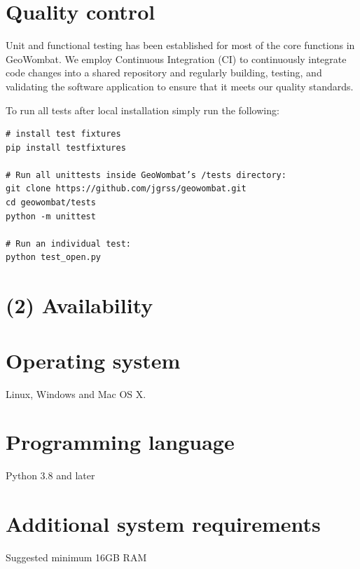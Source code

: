 \documentclass{jors}
\begin{document}
\section*{Quality control}


Unit and functional testing has been established for most of the core functions in GeoWombat. We employ Continuous Integration (CI) to continuously integrate code changes into a shared repository and regularly building, testing, and validating the software application to ensure that it meets our quality standards. 

To run all tests after local installation simply run the following:

\begin{verbatim}
# install test fixtures
pip install testfixtures

# Run all unittests inside GeoWombat’s /tests directory:
git clone https://github.com/jgrss/geowombat.git
cd geowombat/tests
python -m unittest

# Run an individual test:
python test_open.py
\end{verbatim}

\section*{(2) Availability}
\vspace{0.5cm}
\section*{Operating system}
Linux, Windows and Mac OS X.

\section*{Programming language}
Python 3.8 and later

\section*{Additional system requirements}
Suggested minimum 16GB RAM
\end{document}
